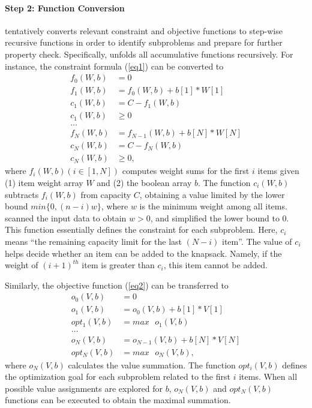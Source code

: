 \paragraph{Step 2: Function Conversion}
\tool tentatively converts relevant constraint and objective functions to step-wise recursive functions in order to identify subproblems and prepare for further property check. 
Specifically, 
\tool unfolds all accumulative functions 
recursively. 
For instance, the constraint formula (\ref{eq1}) can be converted to
\begin{align}
\label{fun1}
f_0(W, b)&=0 \nonumber\\
f_1(W, b)&=f_0(W, b) + b[1] * W[1] \nonumber\\
c_1(W, b)&=C-f_1(W, b)\nonumber\\
c_1(W, b)&\ge0 \nonumber\\
\ldots \tag{3.3}\\  
f_N(W, b)&=f_{N-1}(W, b) + b[N] * W[N] \nonumber\\
c_N(W, b)&=C-f_N(W, b) \nonumber\\
c_N(W, b)& \ge 0, \nonumber
\end{align}
where $f_i(W, b) (i\in[1, N])$ computes weight sums for the first $i$ items given (1) item weight array $W$ and (2) the boolean array $b$.
The function $c_i(W, b)$ subtracts $f_i(W, b)$ from capacity $C$, obtaining a value limited by the lower bound $min\{0, (n-i)w\}$, where $w$ is the minimum weight among all items. \tool scanned the input data to obtain $w > 0$, and simplified the lower bound to $0$. This function essentially defines the constraint for each subproblem. Here, $c_i$ means ``the remaining capacity limit for the last $(N-i)$ item''. The value of $c_i$ helps decide whether an item can be added to the knapsack. Namely, if the weight of $(i+1)^{th}$ item is greater than $c_i$, this item cannot be added.

Similarly, the objective function (\ref{eq2}) can be transferred to
\begin{align}
\label{fun2}
o_0(V, b)&=0 \nonumber\\
o_1(V, b)&=o_0(V, b) + b[1] * V[1]\nonumber\\
opt_1(V, b)&=max \text{ }o_1(V, b) \nonumber\\
\ldots \tag{3.4}\\
o_N(V, b)&=o_{N-1}(V, b) + b[N] * V[N]\nonumber\\
opt_N(V, b)&=max\text{ }o_N(V, b), \nonumber
\end{align}
where $o_N(V, b)$ calculates the value summation.
The function $opt_i(V, b)$ defines the optimization goal for each subproblem related to the first $i$ items. When all possible value assignments are explored for $b$, $o_N(V, b)$ and $opt_N(V, b)$ functions can be executed to obtain the maximal summation. 

